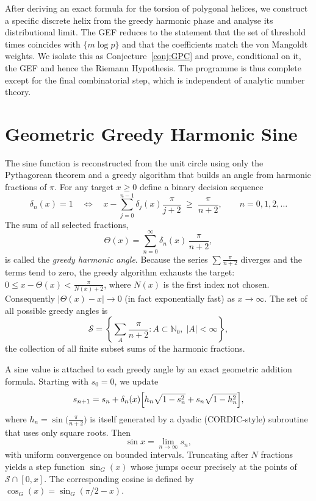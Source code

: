 \documentclass[11pt,a4paper]{article}
\newcommand{\N}{\mathbb{N}}
\begin{document}
After deriving an exact formula for the torsion of polygonal helices, we
construct a specific discrete helix from the greedy harmonic phase and
analyse its distributional limit.  The GEF reduces to the statement that
the set of threshold times coincides with \(\{m\log p\}\) and that the
coefficients match the von Mangoldt weights.  We isolate this as
Conjecture~\ref{conj:GPC} and prove, conditional on it, the GEF and
hence the Riemann Hypothesis.  The programme is thus complete except
for the final combinatorial step, which is independent of analytic number
theory.

\section{Geometric Greedy Harmonic Sine}

The sine function is reconstructed from the unit circle using only
the Pythagorean theorem and a greedy algorithm that builds an angle
from harmonic fractions of \(\pi\).  For any target \(x\ge 0\) define a
binary decision sequence
\[
\delta_n(x) = 1 \quad\Longleftrightarrow\quad
x - \sum_{j=0}^{n-1} \delta_j(x)\frac{\pi}{j+2} \;\ge\; \frac{\pi}{n+2},
\qquad n=0,1,2,\dots
\]
The sum of all selected fractions,
\[
\Theta(x) = \sum_{n=0}^{\infty} \delta_n(x)\,\frac{\pi}{n+2},
\]
is called the \emph{greedy harmonic angle}.  Because the series
\(\sum \frac{\pi}{n+2}\) diverges and the terms tend to zero, the greedy
algorithm exhausts the target: \(0 \le x - \Theta(x) < \frac{\pi}{N(x)+2}\),
where \(N(x)\) is the first index not chosen.  Consequently
\(|\Theta(x)-x| \to 0\) (in fact exponentially fast) as \(x\to\infty\).
The set of all possible greedy angles is
\[
\mathcal{S} = \left\{ \sum_{A} \frac{\pi}{n+2} : A\subset\N_0,\;|A|<\infty \right\},
\]
the collection of all finite subset sums of the harmonic fractions.

A sine value is attached to each greedy angle by an exact geometric
addition formula.  Starting with \(s_0 = 0\), we update
\[
s_{n+1} = s_n + \delta_n(x)
\Bigl[ h_n \sqrt{1-s_n^2} + s_n \sqrt{1-h_n^2} \Bigr],
\]
where \(h_n = \sin\!\bigl(\frac{\pi}{n+2}\bigr)\) is itself generated by a
dyadic (CORDIC‑style) subroutine that uses only square roots.  Then
\[
\sin x = \lim_{n\to\infty} s_n,
\]
with uniform convergence on bounded intervals.  Truncating after \(N\)
fractions yields a step function \(\sin_G(x)\) whose jumps occur
precisely at the points of \(\mathcal{S}\cap[0,x]\).  The corresponding
cosine is defined by \(\cos_G(x) = \sin_G(\pi/2 - x)\).
\end{document}
